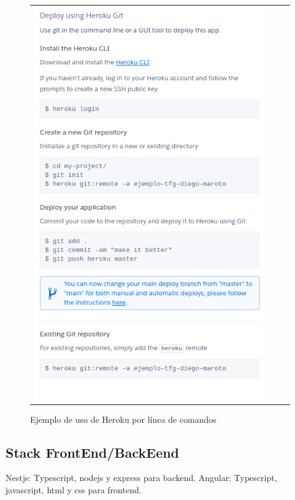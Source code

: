 \begin{figure}[h]
\centering
\begin{tabular}{ccc}
\includegraphics[scale=0.5]{archivos/heroku03.png}
\end{tabular}
\caption{Ejemplo de uso de Heroku por línea de comandos}
\end{figure}
\clearpage
\clearpage
\subsection{Stack FrontEnd/BackEend}
Nestjs: Typescript, nodejs y express para backend.
Angular: Typescript, javascript, html y css para frontend.
\clearpage
